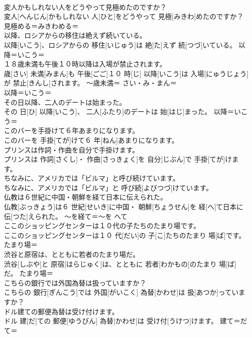 \documentclass[8pt]{extreport}
\begin{document}
\begin{CJK}{UTF8}{min}
\\	変人かもしれない人をどうやって見極めたのですか？	
\\	変人[へんじん]かもしれない 人[ひと]をどうやって 見極[みきわ]めたのですか？	見極める＝みきわめる＝ 
\\	以降、ロシアからの移住は絶えず続いている。	
\\	以降[いこう]、ロシアからの 移住[いじゅう]は 絶[た]えず 続[つづ]いている。	以降＝いこう＝ 
\\	１８歳未満も午後１０時以降は入場が禁止されます。	
\\	歳[さい] 未満[みまん]も 午後[ごご]１０ 時[じ] 以降[いこう]は 入場[にゅうじょう]が 禁止[きんし]されます。	〜歳未満＝ さい・み・まん＝ 
\\	以降＝いこう＝ 
\\	その日以降、二人のデートは始まった。	
\\	その 日[ひ] 以降[いこう]、 二人[ふたり]のデートは 始[はじ]まった。	以降＝いこう＝ 
\\	このバーを手掛けて６年あまりになります。	
\\	このバーを 手掛[てが]けて６ 年[ねん]あまりになります。	
\\	プリンスは作詞・作曲を自分で手掛けます。	
\\	プリンスは 作詞[さくし]・ 作曲[さっきょく]を 自分[じぶん]で 手掛[てが]けます。	
\\	ちなみに、アメリカでは「ビルマ」と呼び続けています。	
\\	ちなみに、アメリカでは「ビルマ」と 呼び続[よびつづ]けています。	
\\	仏教は６世紀に中国・朝鮮を経て日本に伝えられた。	
\\	仏教[ぶっきょう]は６ 世紀[せいき]に中国・ 朝鮮[ちょうせん]を 経[へ]て日本に 伝[つた]えられた。	〜を経て＝〜を へて 
\\	ここのショッピングセンターは１０代の子たちのたまり場です。	
\\	ここのショッピングセンターは１０ 代[だい]の 子[こ]たちのたまり 場[ば]です。	たまり場＝ 
\\	渋谷と原宿は、とともに若者のたまり場だ。	
\\	渋谷[しぶや]と 原宿[はらじゅく]は、とともに 若者[わかもの]のたまり 場[ば]だ。	たまり場＝ 
\\	こちらの銀行では外国為替は扱っていますか？	
\\	こちらの 銀行[ぎんこう]では 外国[がいこく] 為替[かわせ]は 扱[あつか]っていますか？	
\\	ドル建ての郵便為替は受け付けます。	
\\	ドル 建[だ]ての 郵便[ゆうびん] 為替[かわせ]は 受け付[うけつ]けます。	建て＝だて＝ 

\end{CJK}
\end{document}
